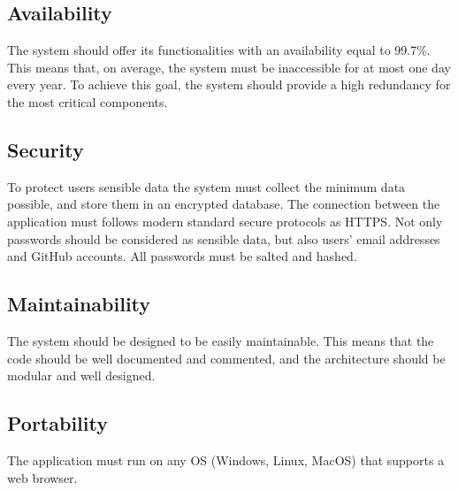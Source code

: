 \subsection{Availability}
The system should offer its functionalities with an availability equal to 99.7\%. This means that, on average, 
the system must be inaccessible for at most one day every year. To achieve this goal, the system should 
provide a high redundancy for the most critical components.

\subsection{Security}
To protect users sensible data the system must collect the minimum data possible, and store them in an
encrypted database. The connection between the application must follows modern standard secure protocols as
HTTPS. Not only passwords should be considered as sensible data, but also users' email addresses and GitHub accounts. 
All passwords must be salted and hashed.

\subsection{Maintainability}
The system should be designed to be easily maintainable. This means that the code should be well documented 
and commented, and the architecture should be modular and well designed.

\subsection{Portability}
The application must run on any OS (Windows, Linux, MacOS) that supports a web browser.